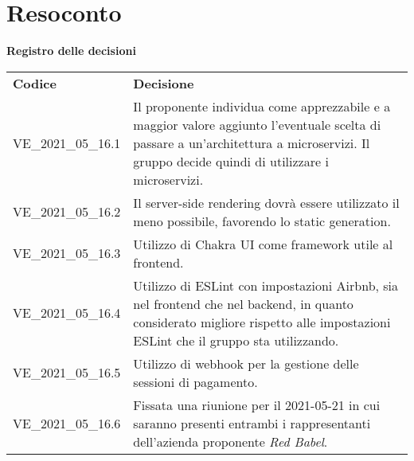\documentclass[a4paper]{article}
\begin{document}
\section{Resoconto}
\begin{center}
    \textbf{\Large Registro delle decisioni}\\
    \vspace{10px}
    \begin{table}[h!]
        \centering
        \renewcommand{\arraystretch}{1.8}
        \begin{tabular}{p{200px} p{200px}}
            \rowcolor{logo!70} \textbf{Codice} & \textbf{Decisione}                                                                                                                                                                          \\
            VE\_2021\_05\_16.1                 & Il proponente individua come apprezzabile e a maggior valore aggiunto l'eventuale scelta di passare a un'architettura a microservizi. Il gruppo decide quindi di utilizzare i microservizi. \\
            VE\_2021\_05\_16.2                 & Il server-side rendering dovrà essere utilizzato il meno possibile, favorendo lo static generation.                                                                                         \\
            VE\_2021\_05\_16.3                 & Utilizzo di Chakra UI come framework utile al frontend.                                                                                                                                     \\
            VE\_2021\_05\_16.4                 & Utilizzo di ESLint con impostazioni Airbnb, sia nel frontend che nel backend, in quanto considerato migliore rispetto alle impostazioni ESLint che il gruppo sta utilizzando.               \\
            VE\_2021\_05\_16.5                 & Utilizzo di webhook per la gestione delle sessioni di pagamento.                                                                                                                            \\
            VE\_2021\_05\_16.6                 & Fissata una riunione per il 2021-05-21 in cui saranno presenti entrambi i rappresentanti dell'azienda proponente \textit{Red Babel}.
        \end{tabular}
    \end{table}
\end{center}
\end{document}
